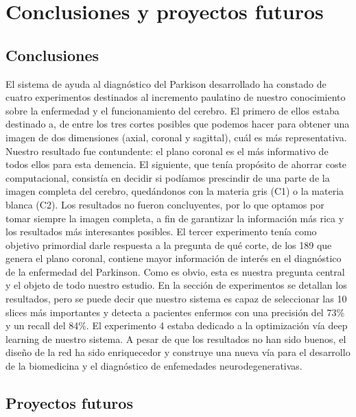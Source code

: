 \section{Conclusiones y proyectos futuros} 

\subsection{Conclusiones}

El sistema de ayuda al diagnóstico del Parkison desarrollado ha constado de cuatro experimentos destinados al incremento paulatino de nuestro conocimiento sobre la enfermedad y el funcionamiento del cerebro. El primero de ellos estaba destinado a, de entre los tres cortes posibles que podemos hacer para obtener una imagen de dos dimensiones (axial, coronal y sagittal), cuál es más representativa. Nuestro resultado fue contundente: el plano coronal es el más informativo de todos ellos para esta demencia. El siguiente, que tenía propósito de ahorrar coste computacional, consistía en decidir si podíamos prescindir de una parte de la imagen completa del cerebro, quedándonos con la materia gris (C1) o la materia blanca (C2). Los resultados no fueron concluyentes, por lo que optamos por tomar siempre la imagen completa, a fin de garantizar la información más rica y los resultados más interesantes posibles. El tercer experimento tenía como objetivo primordial darle respuesta a la pregunta de qué corte, de los 189 que genera el plano coronal, contiene mayor información de interés en el diagnóstico de la enfermedad del Parkinson. Como es obvio, esta es nuestra pregunta central y el objeto de todo nuestro estudio. En la sección de experimentos se detallan los resultados, pero se puede decir que nuestro sistema es capaz de seleccionar las 10 slices más importantes y detecta a pacientes enfermos con una precisión del 73\% y un recall del 84\%. El experimento 4 estaba dedicado a la optimización vía deep learning de nuestro sistema. A pesar de que los resultados no han sido buenos, el diseño de la red ha sido enriquecedor y construye una nueva vía para el desarrollo de la biomedicina y el diagnóstico de enfemedades neurodegenerativas. 

\subsection{Proyectos futuros}


